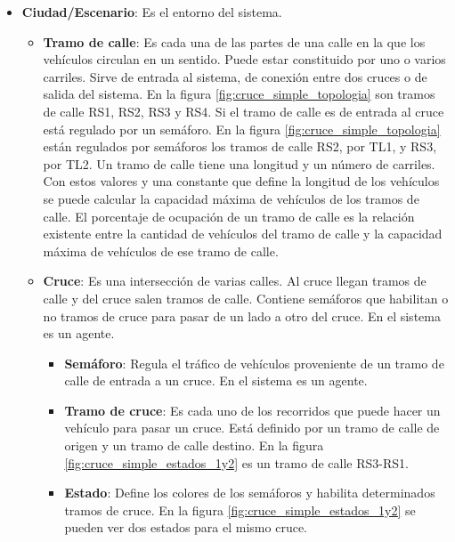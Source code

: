 \begin{itemize}
    \item \textbf{Ciudad/Escenario}: Es el entorno del sistema.
    \begin{itemize}
        \item \textbf{Tramo de calle}: Es cada una de las partes de una calle en la que los vehículos circulan en un sentido. Puede estar constituido por uno o varios carriles. Sirve de entrada al sistema, de conexión entre dos cruces o de salida del sistema. En la figura \ref{fig:cruce_simple_topologia} son tramos de calle RS1, RS2, RS3 y RS4. Si el tramo de calle es de entrada al cruce está regulado por un semáforo. En la figura \ref{fig:cruce_simple_topologia} están regulados por semáforos los tramos de calle RS2, por TL1, y RS3, por TL2. \newline 
        Un tramo de calle tiene una longitud y un número de carriles. Con estos valores y una constante que define la longitud de los vehículos se puede calcular la capacidad máxima de vehículos de los tramos de calle. El porcentaje de ocupación de un tramo de calle es la relación existente entre la cantidad de vehículos del tramo de calle y la capacidad máxima de vehículos de ese tramo de calle.
        \item \textbf{Cruce}: Es una intersección de varias calles. Al cruce llegan tramos de calle y del cruce salen tramos de calle. Contiene semáforos que habilitan o no tramos de cruce para pasar de un lado a otro del cruce. En el sistema es un agente.
        \begin{itemize}
            \item \textbf{Semáforo}: Regula el tráfico de vehículos proveniente de un tramo de calle de entrada a un cruce. En el sistema es un agente.
            \item \textbf{Tramo de cruce}: Es cada uno de los recorridos que puede hacer un vehículo para pasar un cruce. Está definido por un tramo de calle de origen y un tramo de calle destino. En la figura \ref{fig:cruce_simple_estados_1y2} es un tramo de calle RS3-RS1.
            \item \textbf{Estado}: Define los colores de los semáforos y habilita determinados tramos de cruce. En la figura \ref{fig:cruce_simple_estados_1y2} se pueden ver dos estados para el mismo cruce. 
        \end{itemize}
    \end{itemize}
\end{itemize}

